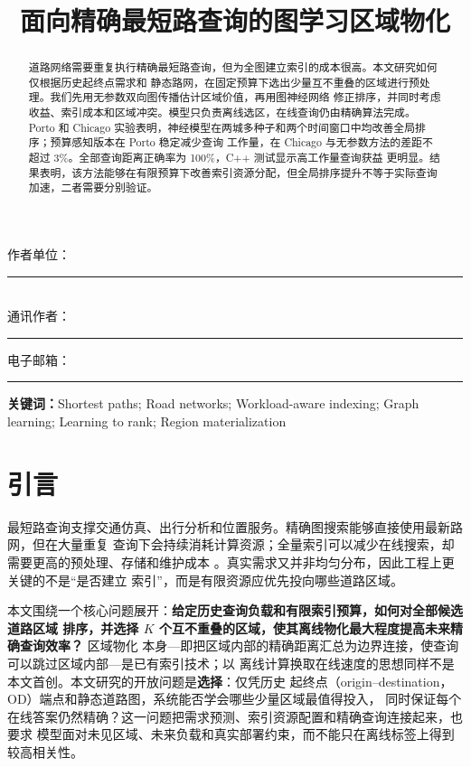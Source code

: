 \documentclass[UTF8,a4paper,10pt,twocolumn]{ctexart}
\title{面向精确最短路查询的图学习区域物化}
\author{\AICAuthors}
\date{\AICDraftDate}
\author{}
\date{}
\begin{document}
\maketitle

\ifdefined\AICAuthorVersion
\begin{center}
作者单位：\rule{0.66\linewidth}{0.4pt}\\[0.6em]
通讯作者：\rule{0.22\linewidth}{0.4pt}\qquad
电子邮箱：\rule{0.30\linewidth}{0.4pt}
\end{center}
\fi

\begin{abstract}
道路网络需要重复执行精确最短路查询，但为全图建立索引的成本很高。本文研究如何仅根据历史起终点需求和
静态路网，在固定预算下选出少量互不重叠的区域进行预处理。我们先用无参数双向图传播估计区域价值，再用图神经网络
修正排序，并同时考虑收益、索引成本和区域冲突。模型只负责离线选区，在线查询仍由精确算法完成。Porto 和
Chicago 实验表明，神经模型在两城多种子和两个时间窗口中均改善全局排序；预算感知版本在 Porto 稳定减少查询
工作量，在 Chicago 与无参数方法的差距不超过 3\%。全部查询距离正确率为 100\%，C++ 测试显示高工作量查询获益
更明显。结果表明，该方法能够在有限预算下改善索引资源分配，但全局排序提升不等于实际查询加速，二者需要分别验证。
\end{abstract}

\noindent\textbf{关键词：}Shortest paths; Road networks; Workload-aware indexing;
Graph learning; Learning to rank; Region materialization

\section{引言}

最短路查询支撑交通仿真、出行分析和位置服务。精确图搜索能够直接使用最新路网，但在大量重复
查询下会持续消耗计算资源；全量索引可以减少在线搜索，却需要更高的预处理、存储和维护成本
\citep{dijkstra1959,salt2014}。真实需求又并非均匀分布，因此工程上更关键的不是“是否建立
索引”，而是有限资源应优先投向哪些道路区域。

本文围绕一个核心问题展开：\textbf{给定历史查询负载和有限索引预算，如何对全部候选道路区域
排序，并选择 $K$ 个互不重叠的区域，使其离线物化最大程度提高未来精确查询效率？} 区域物化
本身---即把区域内部的精确距离汇总为边界连接，使查询可以跳过区域内部---是已有索引技术；以
离线计算换取在线速度的思想同样不是本文首创。本文研究的开放问题是\textbf{选择}：仅凭历史
起终点（origin--destination，OD）端点和静态道路图，系统能否学会哪些少量区域最值得投入，
同时保证每个在线答案仍然精确？这一问题把需求预测、索引资源配置和精确查询连接起来，也要求
模型面对未见区域、未来负载和真实部署约束，而不能只在离线标签上得到较高相关性。
\end{document}
